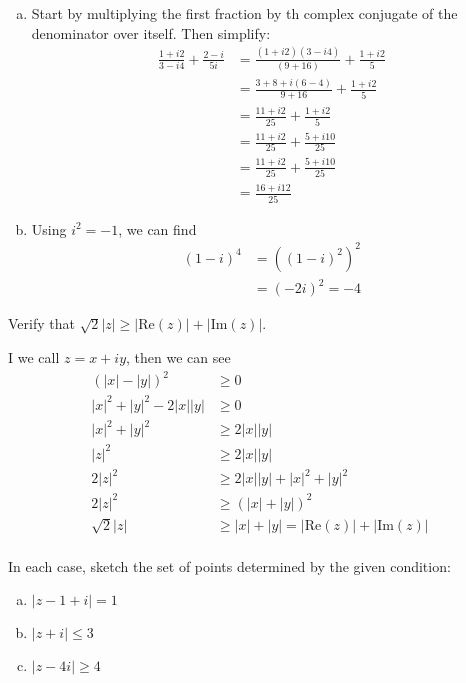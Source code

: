 \documentclass{article}
\begin{document}
\begin{solution}
\begin{enumerate}[(a)]
\item Start by multiplying the first fraction by th complex conjugate of the denominator over itself. Then simplify:
\begin{align*}
\frac{1+i2}{3-i4} + \frac{2-i}{5i} &= \frac{(1+i2)(3-i4)}{(9+16)} + \frac{1+i2}{5} \\
&= \frac{3+8+i(6-4)}{9+16} + \frac{1+i2}{5} \\
&= \frac{11+i2}{25} + \frac{1+i2}{5} \\
&= \frac{11+i2}{25} + \frac{5+i10}{25} \\
&= \frac{11+i2}{25} + \frac{5+i10}{25} \\
&= \boxed{\frac{16+i12}{25}}
\end{align*}
\item
Using $i^{2}=-1$, we can find
\begin{align*}
(1-i)^{4} &= \left( (1-i)^{2} \right)^{2} \\
&= \left( -2i \right)^{2} = \boxed{-4}
\end{align*}
\end{enumerate}
\end{solution}

\begin{problem}
Verify that $\sqrt{2}|z| \ge |\text{Re}(z)| + |\text{Im}(z)|$.
\end{problem}

\begin{solution}
I we call $z=x+iy$, then we can see
\begin{align*}
(|x|-|y|)^{2} &\ge 0 \\
|x|^{2} +|y|^{2} -2|x||y| &\ge 0 \\
|x|^{2} +|y|^{2} &\ge 2|x||y| \\
|z|^{2} &\ge 2|x||y| \\
2|z|^{2} &\ge 2|x||y| + |x|^{2} +|y|^{2} \\
2|z|^{2} &\ge \left(|x| +|y|\right)^{2} \\
\sqrt{2}|z| &\ge |x| +|y| = |\text{Re}(z)| + |\text{Im}(z)| \\
\end{align*}
\end{solution}

\begin{problem}
In each case, sketch the set of points determined by the given condition:
\begin{enumerate}[(a)]
\item $|z-1+i|=1$
\item $|z+i|\le 3$
\item $|z-4i|\ge 4$
\end{enumerate}
\end{problem}
\end{document}
